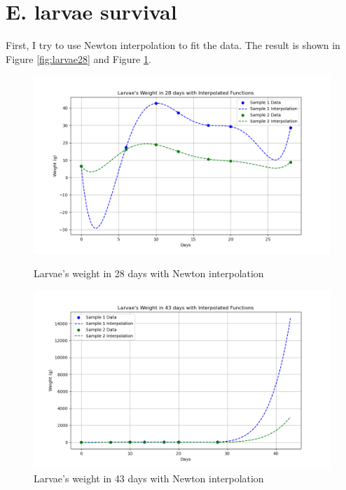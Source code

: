 \documentclass[a4paper]{article}
\begin{document}
\section{E. larvae survival}
First, I try to use Newton interpolation to fit the data. The result is shown in Figure \ref{fig:larvae28} and Figure \ref{fig:larvae43}.
\begin{figure}[ht]
  \centering
  \begin{minipage}[b]{0.45\textwidth}
    \centering
    \includegraphics[width=\textwidth]{figures/larvae28days.png}
    \caption{Larvae's weight in 28 days with Newton interpolation}
    \label{fig:larvae28}
  \end{minipage}
  \hfill
  \begin{minipage}[b]{0.45\textwidth}
    \centering
    \includegraphics[width=\textwidth]{figures/larvae43days.png}
    \caption{Larvae's weight in 43 days with Newton interpolation}
    \label{fig:larvae43}
  \end{minipage}
  \vfill
  \begin{minipage}[b]{0.45\textwidth}

\end{minipage}
\end{figure}
\end{document}
